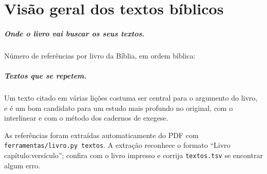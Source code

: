 \chapter{Visão geral dos textos bíblicos}

\paragraph{Onde o livro vai buscar os seus textos.} Número de referências por
livro da Bíblia, em ordem bíblica:

\begin{center}\small\begin{minipage}{.94\linewidth}\raggedright
\textosporlivro
\end{minipage}\end{center}

\paragraph{Textos que se repetem.} Um texto citado em várias lições costuma
ser central para o argumento do livro, e é um bom candidato para um estudo
mais profundo no original, com o interlinear e com o método dos cadernos de
exegese.

\textosmaiscitados[2]

\begin{nota}
As referências foram extraídas automaticamente do PDF com
\texttt{ferramentas/livro.py textos}. A extração reconhece o formato
\enquote{Livro capítulo:versículo}; confira com o livro impresso e corrija
\texttt{textos.tsv} se encontrar algum erro.
\end{nota}
